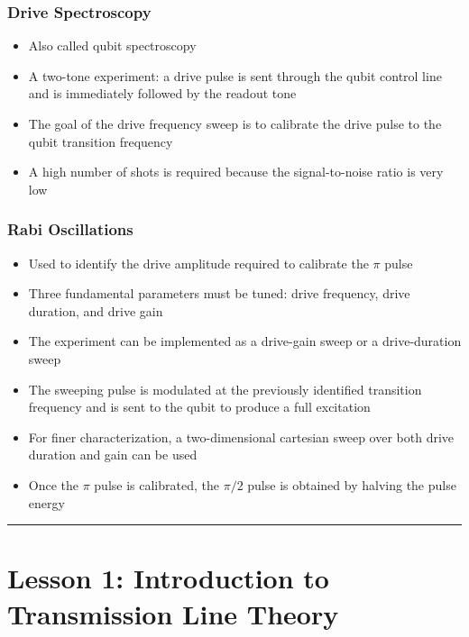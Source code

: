 \documentclass[
]{article}
\providecommand{\tightlist}{%
  \setlength{\itemsep}{0pt}\setlength{\parskip}{0pt}}
\begin{document}
\subsubsection{Drive Spectroscopy}\label{drive-spectroscopy}

\begin{itemize}
\tightlist
\item
  Also called qubit spectroscopy
\item
  A two-tone experiment: a drive pulse is sent through the qubit control
  line and is immediately followed by the readout tone
\item
  The goal of the drive frequency sweep is to calibrate the drive pulse
  to the qubit transition frequency
\item
  A high number of shots is required because the signal-to-noise ratio
  is very low
\end{itemize}

\subsubsection{Rabi Oscillations}\label{rabi-oscillations}

\begin{itemize}
\tightlist
\item
  Used to identify the drive amplitude required to calibrate the \(\pi\)
  pulse
\item
  Three fundamental parameters must be tuned: drive frequency, drive
  duration, and drive gain
\item
  The experiment can be implemented as a drive-gain sweep or a
  drive-duration sweep
\item
  The sweeping pulse is modulated at the previously identified
  transition frequency and is sent to the qubit to produce a full
  excitation
\item
  For finer characterization, a two-dimensional cartesian sweep over
  both drive duration and gain can be used
\item
  Once the \(\pi\) pulse is calibrated, the \(\pi/2\) pulse is obtained
  by halving the pulse energy
\end{itemize}

\begin{center}\rule{0.5\linewidth}{0.5pt}\end{center}

\section{Lesson 1: Introduction to Transmission Line
Theory}\label{lesson-1-introduction-to-transmission-line-theory}
\end{document}
